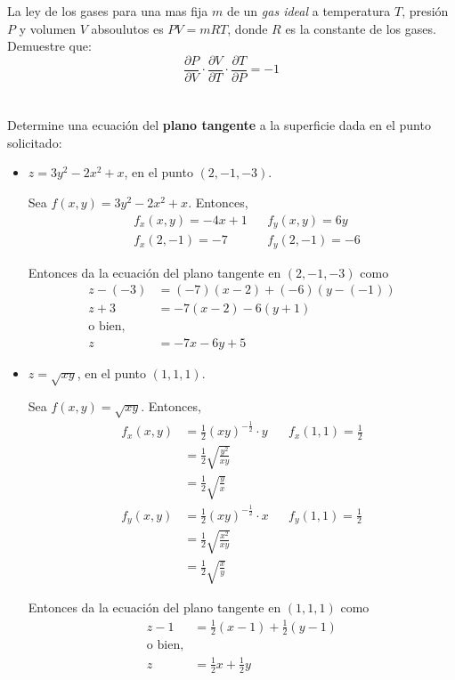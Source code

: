 \documentclass[12pt]{article}
\begin{document}
\section{}

La ley de los gases para una mas fija $m$ de un \textit{gas ideal} a temperatura $T$, presión $P$ y volumen $V$ absoulutos es $P V = mRT$, donde $R$ es la constante de los gases. Demuestre que:
$$\frac{\partial P}{\partial V} \cdot \frac{\partial V}{\partial T} \cdot \frac{\partial T}{\partial P} = -1$$

\section{}

Determine una ecuación del \textbf{plano tangente} a la superficie dada en el punto solicitado:

\begin{itemize}[format=\textbf]

\item $z=3y^2-2x^2+x$, en el punto $(2,-1,-3)$.

Sea $f(x,y)=3y^2-2x^2+x$. Entonces,
\begin{align*}
&f_x(x,y)=-4x+1 
&&
f_y(x,y)=6y \\
&f_x(2,-1)=-7
&&
f_y(2,-1)=-6
\end{align*}

Entonces da la ecuación del plano tangente en $(2,-1,-3)$ como
\begin{align*}
z-(-3)&=(-7)(x-2)+(-6)(y-(-1)) \\
z+3&=-7(x-2)-6(y+1) \\
\text{o bien,}\\
z&=-7x-6y+5
\end{align*}

\item $z=\sqrt{xy}$, en el punto $(1,1,1)$.

Sea $f(x,y)=\sqrt{xy}$. Entonces,
\begin{align*}
  f_x(x,y) &= \frac{1}{2}(xy)^{-\frac{1}{2}} \cdot y
  && f_x(1,1) = \frac{1}{2} \\
&= \frac{1}{2}\sqrt{\frac{y^2}{xy}} \\
&= \frac{1}{2}\sqrt{\frac{y}{x}} \\
  f_y(x,y) &= \frac{1}{2}(xy)^{-\frac{1}{2}} \cdot x
  && f_y(1,1) = \frac{1}{2}\\
&= \frac{1}{2}\sqrt{\frac{x^2}{xy}} \\
&= \frac{1}{2}\sqrt{\frac{x}{y}} 
\end{align*}

Entonces da la ecuación del plano tangente en $(1,1,1)$ como
\begin{align*}
z-1 &= \frac{1}{2}(x-1) + \frac{1}{2}(y-1) \\
\text{o bien,}\\
z &= \frac{1}{2}x + \frac{1}{2}y
\end{align*}

\end{itemize}
\end{document}

